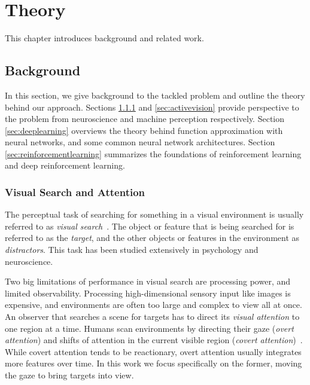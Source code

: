 \chapter{Theory}
\label{cha:theory}

This chapter introduces background and related work.

\section{Background}
\label{sec:background}

In this section, we give background to the tackled problem and outline the theory behind our approach.
Sections \ref{sec:visualsearch} and \ref{sec:activevision} provide perspective to the problem from neuroscience and machine perception respectively.
Section \ref{sec:deeplearning} overviews the theory behind function approximation with neural networks, and some common neural network architectures.
Section \ref{sec:reinforcementlearning} summarizes the foundations of reinforcement learning and deep reinforcement learning.

\subsection{Visual Search and Attention}
\label{sec:visualsearch}

The perceptual task of searching for something in a visual environment is usually referred to as \textit{visual search}~\cite{wolfe_visual_2010}.
The object or feature that is being searched for is referred to as the \textit{target}, and the other objects or features in the environment as \textit{distractors}.
This task has been studied extensively in psychology and neuroscience.

Two big limitations of performance in visual search are processing power, and limited observability.
Processing high-dimensional sensory input like images is expensive, and environments are often too large and complex to view all at once.
An observer that searches a scene for targets has to direct its \textit{visual attention} to one region at a time.
Humans scan environments by directing their gaze (\textit{overt attention}) and shifts of attention in the current visible region (\textit{covert attention})~\cite{itti_computational_2001}.
While covert attention tends to be reactionary, overt attention usually integrates more features over time.
In this work we focus specifically on the former, moving the gaze to bring targets into view.

